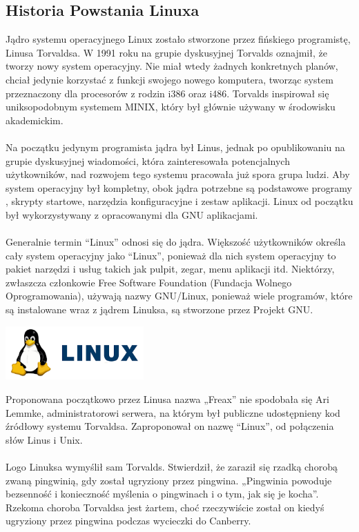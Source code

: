 \documentclass[10pt,a4paper]{report}
\begin{document}
\begin{adjustwidth}{2cm}{2cm}
\section{Historia Powstania Linuxa}
\begin{minipage}{1\linewidth}
Jądro systemu operacyjnego Linux zostało stworzone przez fińskiego programistę, Linusa Torvaldsa. W 1991 roku na grupie dyskusyjnej  Torvalds oznajmił, że tworzy nowy system operacyjny. Nie miał wtedy żadnych konkretnych planów, chciał jedynie korzystać z funkcji swojego nowego komputera, tworząc system przeznaczony dla procesorów z rodzin i386 oraz i486. Torvalds inspirował się uniksopodobnym systemem MINIX, który był głównie używany w środowisku akademickim. \\ \\
Na początku jedynym programista jądra był Linus, jednak  po opublikowaniu na grupie dyskusyjnej wiadomości, która zainteresowała potencjalnych użytkowników, nad rozwojem tego systemu pracowała już spora grupa ludzi.
Aby system operacyjny był kompletny, obok jądra potrzebne są  podstawowe programy , skrypty startowe, narzędzia konfiguracyjne i zestaw aplikacji. Linux od początku był wykorzystywany z opracowanymi dla GNU aplikacjami. \\ \\
Generalnie termin “Linux” odnosi się do jądra. Większość użytkowników określa cały system operacyjny jako  “Linux”, ponieważ dla nich system operacyjny to pakiet narzędzi i usług takich jak pulpit, zegar, menu aplikacji itd. Niektórzy, zwłaszcza członkowie Free Software Foundation (Fundacja Wolnego Oprogramowania), używają nazwy GNU/Linux, ponieważ wiele programów, które są instalowane wraz z jądrem Linuksa, są stworzone przez Projekt GNU. 
\end{minipage}
 \begin{minipage}{\linewidth}
\begin{center}
  \includegraphics[width=200px]{img/linux-logo}
\end{center}
\end{minipage}
\begin{minipage}{1\linewidth}
\vspace{0.3cm}
Proponowana początkowo przez Linusa nazwa „Freax” nie spodobała się  Ari Lemmke, administratorowi serwera, na którym był publiczne udostępnieny kod źródłowy systemu Torvaldsa. Zaproponował on nazwę “Linux”, od połączenia słów  Linus i Unix.  \\ \\
Logo Linuksa wymyślił sam Torvalds. Stwierdził, że zaraził się rzadką chorobą zwaną pingwinią, gdy został ugryziony przez pingwina. „Pingwinia powoduje bezsenność i konieczność myślenia o pingwinach i o tym, jak się je kocha”. Rzekoma choroba Torvaldsa jest żartem, choć rzeczywiście został on kiedyś ugryziony przez pingwina podczas wycieczki do Canberry. 
\end{minipage}

\end{adjustwidth}
\end{document}
